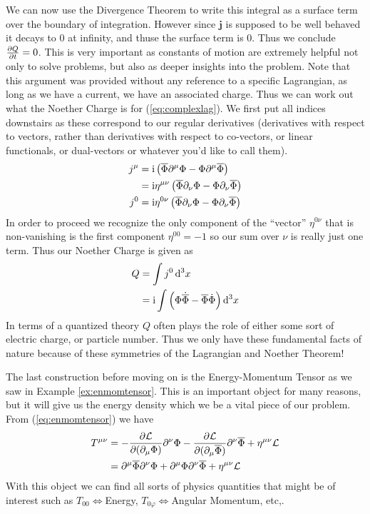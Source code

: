 We can now use the Divergence Theorem to write this integral as a surface term over the boundary of integration. However since $\mathbf{j}$ is supposed to be well behaved it decays to 0 at infinity, and thuse the surface term is 0. Thus we conclude $\pdv{Q}{t} = 0$. This is very important as constants of motion are extremely helpful not only to solve problems, but also as deeper insights into the problem. Note that this argument was provided without any reference to a specific Lagrangian, as long as we have a current, we have an associated charge. Thus we can work out what the Noether Charge is for (\ref{eq:complexlag}). We first put all indices downstairs as these correspond to our regular derivatives (derivatives with respect to vectors, rather than derivatives with respect to co-vectors, or linear functionals, or dual-vectors or whatever you'd like to call them).
\begin{align}
j^\mu & = \mathrm{i}\left(\overline{\Phi}\partial^\mu\Phi - \Phi\partial^\mu\overline{\Phi}\right) \\
 & = \mathrm{i}\eta^{\mu\nu}\left(\overline{\Phi}\partial_\nu\Phi - \Phi\partial_\nu\overline{\Phi}\right) \\
j^0 & = \mathrm{i}\eta^{0\nu}\left(\overline{\Phi}\partial_\nu\Phi - \Phi\partial_\nu\overline{\Phi}\right)
\end{align}
In order to proceed we recognize the only component of the ``vector'' $\eta^{0\nu}$ that is non-vanishing is the first component $\eta^{00} = -1$ so our sum over $\nu$ is really just one term. Thus our Noether Charge is given as
\begin{align}
Q & = \int j^0\dd[3]{x} \\
 & = \mathrm{i}\int\left(\Phi\dot{\overline{\Phi}} - \overline{\Phi}\dot{\Phi}\right)\dd[3]{x}\label{eq:charge}
\end{align}
In terms of a quantized theory $Q$ often plays the role of either some sort of electric charge, or particle number. Thus we only have these fundamental facts of nature because of these symmetries of the Lagrangian and Noether Theorem!

The last construction before moving on is the Energy-Momentum Tensor as we saw in Example \ref{ex:enmomtensor}. This is an important object for many reasons, but it will give us the energy density which we be a vital piece of our problem. From (\ref{eq:enmomtensor}) we have
\begin{align}
T^{\mu\nu} & = -\pdv{\mathcal{L}}{(\partial_\mu\Phi)}\partial^\nu\Phi - \pdv{\mathcal{L}}{(\partial_\mu\overline{\Phi})}\partial^\nu\overline{\Phi} + \eta^{\mu\nu}\mathcal{L} \\
 & = \partial^\mu\overline{\Phi}\partial^\nu\Phi + \partial^\mu\Phi\partial^\nu\overline{\Phi} + \eta^{\mu\nu}\mathcal{L} \label{eq:enmomlowered}
\end{align}
With this object we can find all sorts of physics quantities that might be of interest such as $T_{00}\!\iff$Energy, $T_{0\varphi}\!\iff$Angular Momentum, etc,.

